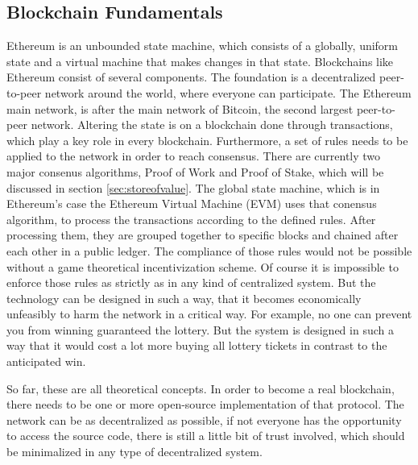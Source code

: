 \subsection{Blockchain Fundamentals}
Ethereum is an unbounded state machine, which consists of a globally, uniform state and a virtual machine that makes changes in that state. Blockchains like Ethereum
consist of several components. The foundation is a decentralized peer-to-peer network around the world, where everyone can participate. The Ethereum main network, is
after the main network of Bitcoin, the second largest peer-to-peer network. Altering the state is on a blockchain done through transactions, which play a key role in
every blockchain. Furthermore, a set of rules needs to be applied to the network in order to reach consensus. There are currently two major consenus algorithms,
Proof of Work and Proof of Stake, which will be discussed in section \ref{sec:storeofvalue}. The global state machine, which is in Ethereum's case the Ethereum
Virtual Machine (EVM) uses that conensus algorithm, to process the transactions according to the defined rules. After processing them, they are grouped together to
specific blocks and chained after each other in a public ledger. The compliance of those rules would not be possible without a game theoretical incentivization
scheme. Of course it is impossible to enforce those rules as strictly as in any kind of centralized system. But the technology can be designed in such a way, that
it becomes economically unfeasibly to harm the network in a critical way. For example, no one can prevent you from winning guaranteed the lottery. But the system
is designed in such a way that it would cost a lot more buying all lottery tickets in contrast to the anticipated win.

So far, these are all theoretical concepts. In order to become a real blockchain, there needs to be one or more open-source implementation of that protocol. The
network can be as decentralized as possible, if not everyone has the opportunity to access the source code, there is still a little bit of trust involved, which
should be minimalized in any type of decentralized system.

